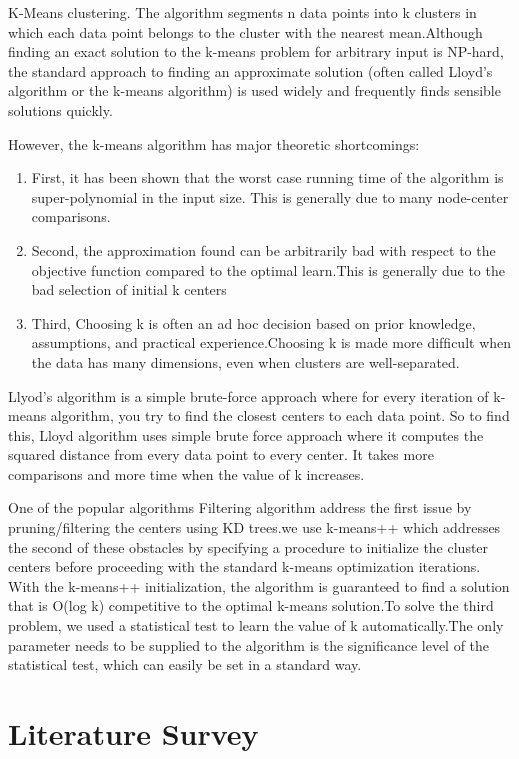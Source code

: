 \documentclass[conference]{IEEEtran}
\begin{document}
K-Means clustering. The algorithm segments n data points into k clusters in which each data point belongs to the cluster with the nearest mean.Although finding an exact solution to the k-means problem for arbitrary input is NP-hard, the standard approach to finding an approximate solution (often called Lloyd's algorithm or the k-means algorithm) is used widely and frequently finds sensible solutions quickly.

However, the k-means algorithm has major theoretic shortcomings:
\begin{enumerate}
  \item First, it has been shown that the worst case running time of the algorithm is super-polynomial in the input size. This is generally due to many node-center comparisons.
  \item Second, the approximation found can be arbitrarily bad with respect to the objective function compared to the optimal learn.This is generally due to the bad selection of initial k centers
  \item Third,  Choosing k is often an ad hoc decision based on prior knowledge, assumptions, and practical experience.Choosing k is made more difﬁcult when the data has many dimensions, even when clusters are well-separated.
\end{enumerate}

 Llyod’s algorithm is a simple brute-force approach where for every iteration of k-means algorithm, you try to find the closest centers to each data point. So to find this, Lloyd algorithm uses simple brute force approach where it computes the squared distance from every data point to every center. It takes more comparisons and more time when the value of k increases.
 
 One of the popular algorithms Filtering algorithm address the first issue by pruning/filtering the centers using KD trees.we use k-means++ which addresses the second of these obstacles by specifying a procedure to initialize the cluster centers before proceeding with the standard k-means optimization iterations. With the k-means++ initialization, the algorithm is guaranteed to find a solution that is O(log k) competitive to the optimal k-means solution.To solve the third problem, we used a statistical test to learn the value of k automatically.The only parameter needs to be supplied to the algorithm is the signiﬁcance level of the statistical test, which can easily be set in a standard way.
 
 \section{Literature Survey}
\end{document}
